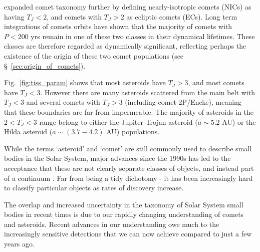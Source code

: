 \cite{1996ASPC..107..173L} expanded comet taxonomy further by defining nearly-isotropic comets (NICs) as having $T_J < 2$, and comets with  $T_J > 2$ as ecliptic comets (ECs). Long term integrations of comets orbits have shown that the majority of comets with $P < 200$ yrs remain in one of these two classes in their dynamical lifetimes. These classes are therefore regarded as dynamically significant, reflecting perhaps the existence of the origin of these two comet populations (see \S~\ref{sec:origin_of_comets}).

Fig.~\ref{fig:tiss_param} shows that most asteroids have $T_J>3$, and most comets have $T_J<3$. However there are many asteroids scattered from the main belt with $T_J < 3$ and several comets with  $T_J > 3$ (including comet 2P/Encke), meaning that these boundaries are far from impermeable. The majority of asteroids in the $2 < T_J < 3$ range belong to either the Jupiter Trojan asteroid ($a \sim 5.2$ AU) or the Hilda asteroid ($a \sim (3.7-4.2)$ AU) populations.

While the terms `asteroid' and `comet' are still commonly used to describe small bodies in the Solar System, major advances since the 1990s has led to the acceptance that these are not clearly separate classes of objects, and instead part of a continuum \citep{1989aste.conf..880W, 2002aste.book..669W}. Far from being a tidy dichotomy - it has been increasingly hard to classify particular objects as rates of discovery increase.


The overlap and increased uncertainty in the taxonomy of Solar System small bodies in recent times is due to our rapidly changing understanding of comets and asteroids. Recent advances in our understanding owe much to the increasingly sensitive detections that we can now achieve compared to just a few years ago.

